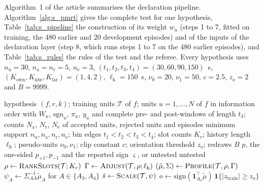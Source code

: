 \documentclass[pdflatex,sn-mathphys-num]{sn-jnl}%
\theoremstyle{thmstyleone}%
\theoremstyle{thmstyletwo}%
\theoremstyle{thmstylethree}%
\begin{document}
Algorithm~1 of the article summarises the declaration pipeline. Algorithm~\ref{alg:s_pmrt} gives the complete test for
one hypothesis, Table~\ref{tab:s_pipeline} the construction of its weight $w_u$ (steps 1 to 7, fitted on training, the
480 earlier and 20 development episodes) and of the inputs of the declaration layer (step 8, which runs steps 1 to 7
on the 480 earlier episodes), and Table~\ref{tab:s_rules} the rules of the test and the referee. Every hypothesis uses
$n_{\mathrm{u}} = 30$, $n_{\mathrm{a}} = n_{\mathrm{r}} = 5$, $n_{\mathrm{e}} = 3$,
$(t_1, t_2, t_3, t_4) = (30, 60, 90, 150)$~s,
$(K_{\mathrm{own}}, K_{\mathrm{nbr}}, K_{\mathrm{far}}) = (1, 4, 2)$, $\ell_{\mathrm{h}} = 150$~s,
$\nu_0 = 20$, $\nu_1 = 50$, $c = 2.5$, $z_o = 2$ and $B = 9999$.

\begin{algorithm}[tbp]
\caption{Complete PMRT for one hypothesis.}
\label{alg:s_pmrt}
\scriptsize
\begin{algorithmic}[1]
\Require hypothesis $(f, r, k)$; training units $\mathcal{T}$ of $f$; units $u = 1, \dots, N$ of $f$ in information
  order with $W_u$, $\mathrm{sgn}_u$, $\pi_u$, $y_u$ and complete pre- and post-windows of length $t_3$; counts
  $N_{\mathrm{a}}$, $N_{\mathrm{r}}$, $N_{\mathrm{e}}$ of accepted units, rejected units and episodes
\Require minimum support $n_{\mathrm{u}}, n_{\mathrm{a}}, n_{\mathrm{r}}, n_{\mathrm{e}}$; bin edges
  $t_1 < t_2 < t_3 < t_4$; slot counts $K_r$; history length $\ell_{\mathrm{h}}$; pseudo-units $\nu_0, \nu_1$;
  clip constant $c$; orientation threshold $z_o$; redraws $B$
\Ensure $p$, the one-sided $p_{+1}, p_{-1}$ and the reported sign $\varsigma$, or untested
  \State \Return untested 
\EndIf
\State $\rho \gets \textsc{RankSlots}(\mathcal{T}; K_r)$ 
\State $\Gamma \gets \textsc{Adjust}(\mathcal{T}, \rho; \ell_{\mathrm{h}})$ 
\State $(\tilde\mu, \Sigma) \gets \textsc{Profile}(\mathcal{T}, \rho, \Gamma)$ 
\State $\psi_A \gets \Sigma_{AA}^{-1} \tilde\mu_A$ for $A \in \{A_3, A_4\}$ 
\State $\hat s \gets \textsc{Scale}(\mathcal{T}, \psi)$ 
\State $o \gets \mathrm{sign}(\mathbf{1}_{A_3}^{\top} \tilde\mu)\, \mathbf{1}\{|z_{\mathrm{train}}| \ge z_o\}$

\end{algorithmic}
\end{algorithm}
\end{document}
